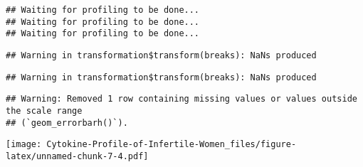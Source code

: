 \documentclass[
]{article}
\newenvironment{Shaded}{\begin{snugshade}}{\end{snugshade}}
\newcommand{\AttributeTok}[1]{\textcolor[rgb]{0.77,0.63,0.00}{#1}}
\newcommand{\CommentTok}[1]{\textcolor[rgb]{0.56,0.35,0.01}{\textit{#1}}}
\newcommand{\DecValTok}[1]{\textcolor[rgb]{0.00,0.00,0.81}{#1}}
\newcommand{\FunctionTok}[1]{\textcolor[rgb]{0.00,0.00,0.00}{#1}}
\newcommand{\NormalTok}[1]{#1}
\newcommand{\OtherTok}[1]{\textcolor[rgb]{0.56,0.35,0.01}{#1}}
\begin{document}
\begin{verbatim}
## Waiting for profiling to be done...
## Waiting for profiling to be done...
## Waiting for profiling to be done...
\end{verbatim}

\begin{verbatim}
## Warning in transformation$transform(breaks): NaNs produced
\end{verbatim}

\begin{verbatim}
## Warning in transformation$transform(breaks): NaNs produced
\end{verbatim}

\begin{verbatim}
## Warning: Removed 1 row containing missing values or values outside the scale range
## (`geom_errorbarh()`).
\end{verbatim}

\texttt{[image: Cytokine-Profile-of-Infertile-Women\_files/figure-latex/unnamed-chunk-7-4.pdf]}

\begin{Shaded}
\end{Shaded}
\end{document}
